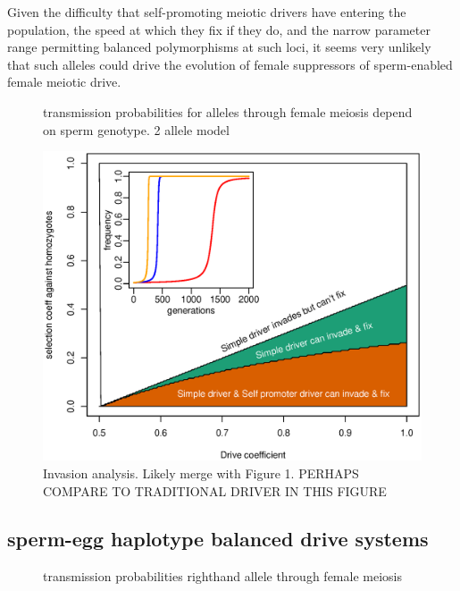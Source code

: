 \documentclass[12pt,letterpaper]{article}
\newcommand{\yb}[1]{{ \color{blue} #1}}
\begin{document}
Given the difficulty that self-promoting meiotic drivers have entering the population, the speed at
which they fix if they do, and the narrow parameter range permitting balanced polymorphisms at such loci,  
it seems very unlikely that such alleles could drive the evolution of female suppressors of sperm-enabled
female meiotic drive.


\begin{figure}
\caption{transmission probabilities for alleles through female
  meiosis depend on sperm genotype. 2 allele model}  
\label{Eggsperm_2_allele_cartoon}
\end{figure}

\begin{figure}
\includegraphics[width = 0.8 \textwidth]{Figures/invasion_space_recessive_driver.eps}
\caption{Invasion analysis. Likely merge with Figure 1. \yb{PERHAPS COMPARE TO TRADITIONAL DRIVER IN THIS FIGURE} } \label{Invasion_space}
\end{figure}


\subsection*{ sperm-egg haplotype balanced drive systems}

\begin{figure}
\caption{transmission probabilities righthand allele through female
  meiosis}  \label{Eggsperm_3_allele_cartoon}
\end{figure}
\end{document}
